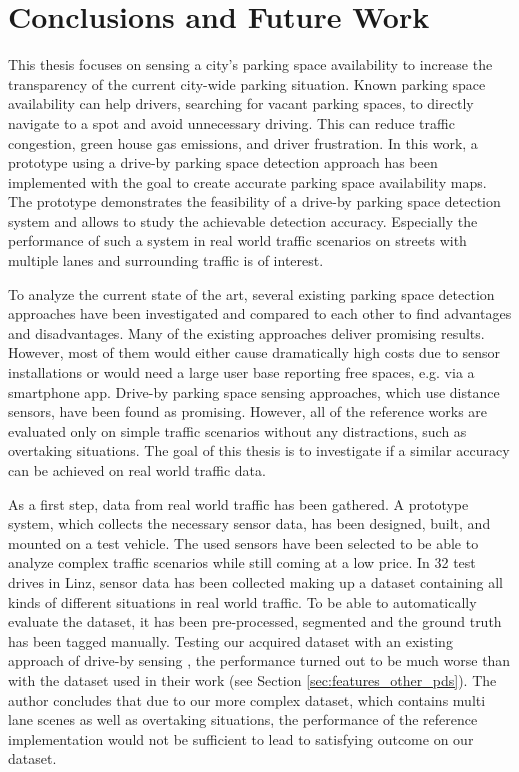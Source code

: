 \chapter{Conclusions and Future Work}
\label{chap:conclusion}



This thesis focuses on sensing a city's parking space availability to increase the transparency of the current city-wide parking situation. 
Known parking space availability can help drivers, searching for vacant parking spaces, to directly navigate to a spot and avoid unnecessary driving. This can reduce traffic congestion, green house gas emissions, and driver frustration. 
In this work, a prototype using a drive-by parking space detection approach has been implemented with the goal to create accurate parking space availability maps. The prototype demonstrates the feasibility of a drive-by parking space detection system and allows to study the achievable detection accuracy. Especially the performance of such a system in real world traffic scenarios on streets with multiple lanes and surrounding traffic is of interest.

To analyze the current state of the art, several existing parking space detection approaches have been investigated and compared to each other to find advantages and disadvantages.
Many of the existing approaches deliver promising results. However, most of them would either cause dramatically high costs due to sensor installations or would need a large user base reporting free spaces, e.g. via a smartphone app.
Drive-by parking space sensing approaches, which use distance sensors, have been found as promising. However, all of the reference works are evaluated only on simple traffic scenarios without any distractions, such as overtaking situations. 
The goal of this thesis is to investigate if a similar accuracy can be achieved on real world traffic data.

As a first step, data from real world traffic has been gathered. A prototype system, which collects the necessary sensor data, has been designed, built, and mounted on a test vehicle. The used sensors have been selected to be able to analyze complex traffic scenarios while still coming at a low price. 
In 32 test drives in Linz, sensor data has been collected making up a dataset containing all kinds of different situations in real world traffic. To be able to automatically evaluate the dataset, it has been pre-processed, segmented and the ground truth has been tagged manually. 
Testing our acquired dataset with an existing approach of drive-by sensing \cite{Mathur:2010:PDS:1814433.1814448}, the performance turned out to be much worse than with the dataset used in their work (see Section \ref{sec:features_other_pds}). The author concludes that due to our more complex dataset, which contains multi lane scenes as well as overtaking situations, the performance of the reference implementation would not be sufficient to lead to satisfying outcome on our dataset.

